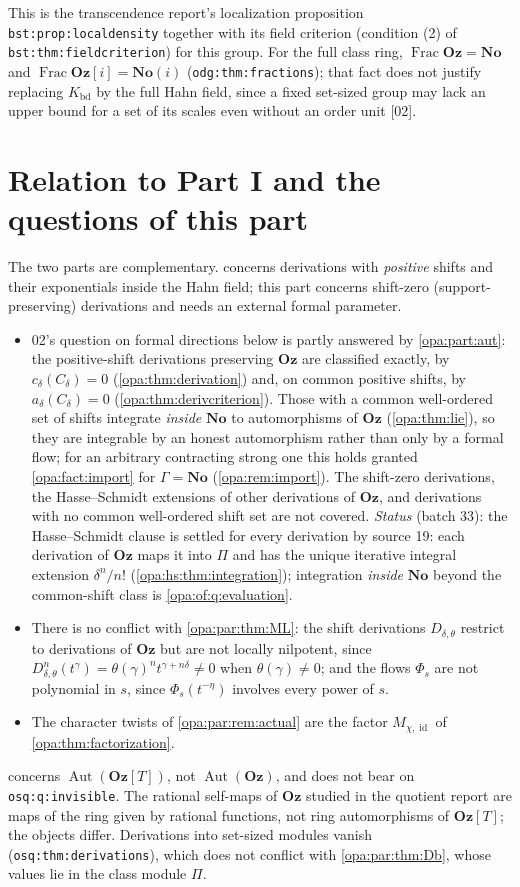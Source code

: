\documentclass[11pt,oneside]{article}
\numberwithin{equation}{section}
\theoremstyle{definition}
\theoremstyle{remark}
\newcommand{\No}{\mathbf{No}}
\newcommand{\Oz}{\mathbf{Oz}}
\newcommand{\Og}{\mathbf{Oz}[i]}
\newcommand{\SC}{\mathbf{No}(i)}
\newcommand{\Aut}{\operatorname{Aut}}
\newcommand{\id}{\operatorname{id}}
\newcommand{\Frac}{\operatorname{Frac}}
\newcommand{\src}[1]{\textup{\textsf{\small[#1]}}}
\newcommand{\lbl}[1]{\nolinkurl{#1}}
\begin{document}
This is the transcendence report's localization proposition
\lbl{bst:prop:localdensity} together with its field criterion (condition (2) of
\lbl{bst:thm:fieldcriterion}) for this group. For the full class ring,
$\Frac\Oz=\No$ and $\Frac\Og=\SC$ (\lbl{odg:thm:fractions}); that fact does not justify
replacing $K_{\mathrm{bd}}$ by the full Hahn field, since a fixed set-sized group may lack
an upper bound for a set of its scales even without an order unit \src{02}.

\section{Relation to Part I and the questions of this part}\label{opa:par:sec:relation}

The two parts are complementary.  concerns derivations with
\emph{positive} shifts and their exponentials inside the Hahn field; this part concerns
shift-zero (support-preserving) derivations and needs an external formal parameter.
\begin{itemize}[itemsep=2pt]
\item 02's question on formal directions below is partly answered by
\cref{opa:part:aut}: the positive-shift derivations preserving $\Oz$ are classified
exactly, by $c_\delta(C_\delta)=0$ (\cref{opa:thm:derivation}) and, on common positive
shifts, by $a_\delta(C_\delta)=0$ (\cref{opa:thm:derivcriterion}). Those with a common
well-ordered set of shifts integrate \emph{inside} $\No$ to automorphisms of $\Oz$
(\cref{opa:thm:lie}), so they are integrable by an honest automorphism rather than only
by a formal flow; for an arbitrary contracting strong one this holds granted
\cref{opa:fact:import} for $\Gamma=\No$ (\cref{opa:rem:import}). The shift-zero derivations, the Hasse--Schmidt extensions of other
derivations of $\Oz$, and derivations with no common well-ordered shift set are not
covered. \emph{Status} (batch 33): the Hasse--Schmidt clause is settled for every
derivation by source 19: each derivation of $\Oz$ maps it into $\Pi$ and has the unique
iterative integral extension $\delta^n/n!$ (\cref{opa:hs:thm:integration}); integration
\emph{inside} $\No$ beyond the common-shift class is \cref{opa:of:q:evaluation}.
\item There is no conflict with \cref{opa:par:thm:ML}: the shift derivations
$D_{\delta,\theta}$ restrict to derivations of $\Oz$ but are not locally nilpotent, since
$D_{\delta,\theta}^n(t^\gamma)=\theta(\gamma)^nt^{\gamma+n\delta}\ne0$ when $\theta(\gamma)\ne0$; and the
flows $\Phi_s$ are not polynomial in $s$, since $\Phi_s(t^{-\eta})$ involves every power
of $s$.
\item The character twists of \cref{opa:par:rem:actual} are the factor $M_{\chi,\id}$ of
\cref{opa:thm:factorization}.
\end{itemize}
 concerns $\Aut(\Oz[T])$, not $\Aut(\Oz)$, and does not bear on
\lbl{osq:q:invisible}. The rational self-maps of $\Oz$ studied in the quotient report
are maps of the ring given by rational functions, not ring automorphisms of $\Oz[T]$; the
objects differ. Derivations into set-sized modules vanish (\lbl{osq:thm:derivations}),
which does not conflict with \cref{opa:par:thm:Db}, whose values lie in the class module
$\Pi$.
\end{document}

